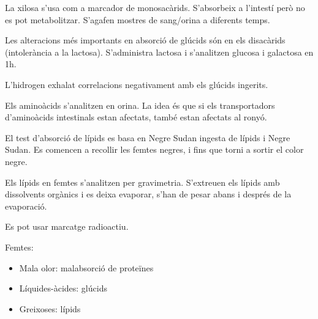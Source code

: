 La xilosa s'usa com a marcador de monosacàrids. S'absorbeix  a
l'intestí però no es pot metabolitzar. S'agafen mostres de sang/orina
a diferents temps.

Les alteracions més importants en absorció de glúcids són en els
disacàrids (intolerància a la lactosa). S'administra lactosa i
s'analitzen glucosa i galactosa en 1h.

L'hidrogen exhalat correlacions negativament amb els glúcids ingerits.

Els aminoàcids s'analitzen en orina. La idea és que si els
transportadors d'aminoàcids intestinals estan afectats, també estan
afectats al ronyó.

El test d'absorció de lípids es basa en Negre Sudan ingesta de lípids
i Negre Sudan. Es comencen a recollir les femtes negres, i fins que
torni a sortir el color negre.

Els lípids en femtes s'analitzen per gravimetria. S'extreuen els
lípids amb dissolvents orgànics i es deixa evaporar, s'han de pesar
abans i després de la evaporació.

Es pot usar marcatge radioactiu.

Femtes:
\begin{itemize}
\item Mala olor: malabsorció de proteïnes
\item Líquides-àcides: glúcids
\item Greixoses: lípids
\end{itemize}